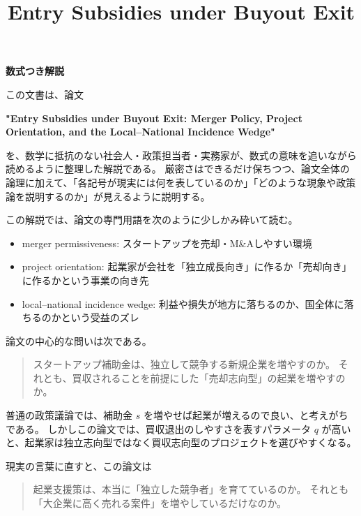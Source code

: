 \documentclass[11pt]{ltjsarticle}
\title{
Entry Subsidies under Buyout Exit
}
\author{}
\date{}
\makeatletter
\renewcommand\section{\@startsection{section}{1}{\z@}{-3.5ex \@plus -1ex \@minus -.2ex}{2.3ex \@plus.2ex}{\normalfont\Large}}
\makeatother
\begin{document}
\maketitle
\tableofcontents
\bigskip


\begin{center}
\large\textbf{数式つき解説}
\end{center}


この文書は、論文

\textbf{"Entry Subsidies under Buyout Exit: Merger Policy, Project Orientation, and the Local--National Incidence Wedge"}

を、数学に抵抗のない社会人・政策担当者・実務家が、数式の意味を追いながら読めるように整理した解説である。  
厳密さはできるだけ保ちつつ、論文全体の論理に加えて、「各記号が現実には何を表しているのか」「どのような現象や政策論を説明するのか」が見えるように説明する。

この解説では、論文の専門用語を次のように少しかみ砕いて読む。

\begin{itemize}[leftmargin=*]
\item merger permissiveness: スタートアップを売却・M\&Aしやすい環境
\item project orientation: 起業家が会社を「独立成長向き」に作るか「売却向き」に作るかという事業の向き先
\item local--national incidence wedge: 利益や損失が地方に落ちるのか、国全体に落ちるのかという受益のズレ
\end{itemize}




\section{この論文の問い}


論文の中心的な問いは次である。

\begin{quote}
スタートアップ補助金は、独立して競争する新規企業を増やすのか。
それとも、買収されることを前提にした「売却志向型」の起業を増やすのか。
\end{quote}


普通の政策議論では、補助金 $s$ を増やせば起業が増えるので良い、と考えがちである。  
しかしこの論文では、買収退出のしやすさを表すパラメータ $q$ が高いと、起業家は独立志向型ではなく買収志向型のプロジェクトを選びやすくなる。

現実の言葉に直すと、この論文は

\begin{quote}
起業支援策は、本当に「独立した競争者」を育てているのか。
それとも「大企業に高く売れる案件」を増やしているだけなのか。
\end{quote}
\end{document}
